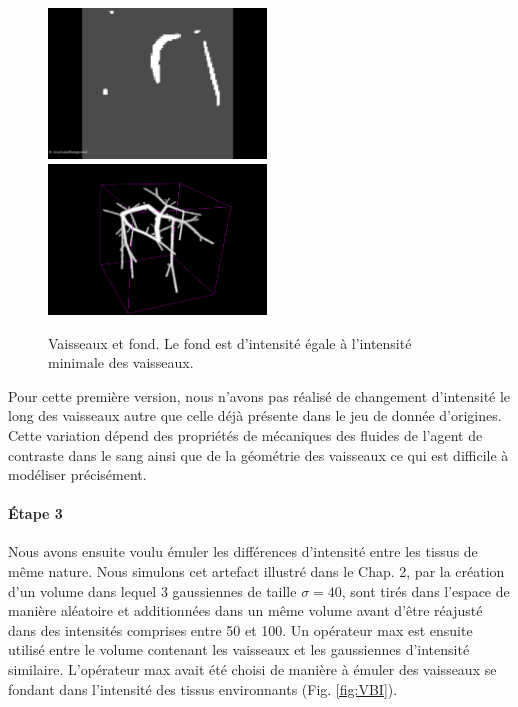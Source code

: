 \begin{figure}[h]
  \centering
  \includegraphics[height=4cm]{Images/2D_VB.png}
  \includegraphics[height=4cm]{Images/3D_VB.png}
  
  \caption{Vaisseaux et fond. Le fond est d'intensité égale à l'intensité minimale des vaisseaux.}
  \label{fig:VB}
\end{figure}

Pour cette première version, nous n'avons pas réalisé de changement d'intensité le long des vaisseaux autre que celle déjà présente dans le jeu de donnée d'origines. Cette variation dépend des propriétés de mécaniques des fluides de l'agent de contraste dans le sang ainsi que de la géométrie des vaisseaux ce qui est difficile à modéliser précisément.

\paragraph{Étape 3}
Nous avons ensuite voulu émuler les différences d'intensité entre les tissus de même nature. Nous simulons cet artefact illustré dans le Chap. 2, par la création d'un volume dans lequel 3 gaussiennes de taille $\sigma=40$, sont tirés dans l'espace de manière aléatoire et additionnées dans un même volume avant d'être réajusté dans des intensités comprises entre 50 et 100. Un opérateur max est ensuite utilisé entre le volume contenant les vaisseaux et les gaussiennes d'intensité similaire. L'opérateur max avait été choisi de manière à émuler des vaisseaux se fondant dans l'intensité des tissus environnants (Fig. \ref{fig:VBI}).

